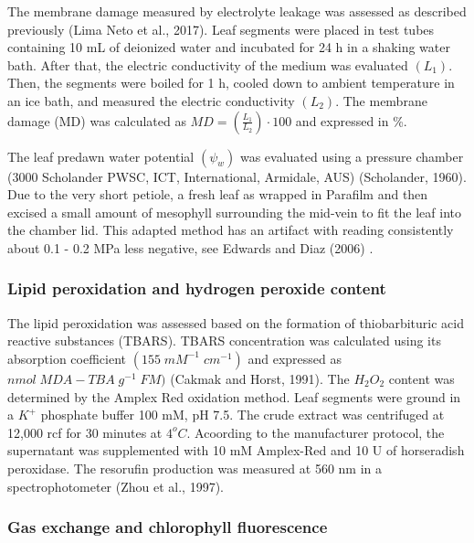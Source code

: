 \documentclass[
  12pt,
  letterpaper,
  DIV=11,
  numbers=noendperiod]{scrartcl}
\begin{document}
The membrane damage measured by electrolyte leakage was assessed as
described previously (Lima Neto et al., 2017). Leaf segments were placed
in test tubes containing 10 mL of deionized water and incubated for 24 h
in a shaking water bath. After that, the electric conductivity of the
medium was evaluated \((L_1)\). Then, the segments were boiled for 1 h,
cooled down to ambient temperature in an ice bath, and measured the
electric conductivity \((L_2)\). The membrane damage (MD) was calculated
as \(MD=\left(\frac{L_1} {L_2}\right) \cdot 100\) and expressed in \%.

The leaf predawn water potential \((\psi_w)\) was evaluated using a
pressure chamber (3000 Scholander PWSC, ICT, International, Armidale,
AUS) (Scholander, 1960). Due to the very short petiole, a fresh leaf as
wrapped in Parafilm and then excised a small amount of mesophyll
surrounding the mid-vein to fit the leaf into the chamber lid. This
adapted method has an artifact with reading consistently about 0.1 - 0.2
MPa less negative, see Edwards and Diaz (2006) .

\hypertarget{lipid-peroxidation-and-hydrogen-peroxide-content}{%
\subsubsection{Lipid peroxidation and hydrogen peroxide
content}\label{lipid-peroxidation-and-hydrogen-peroxide-content}}

The lipid peroxidation was assessed based on the formation of
thiobarbituric acid reactive substances (TBARS). TBARS concentration was
calculated using its absorption coefficient
\((155\; mM^{-1} \; cm^{-1})\) and expressed as
\(nmol\; MDA-TBA\; g^{-1}\; FM)\) (Cakmak and Horst, 1991). The
\(H_2O_2\) content was determined by the Amplex Red oxidation method.
Leaf segments were ground in a \(K^+\) phosphate buffer 100 mM, pH 7.5.
The crude extract was centrifuged at 12,000 rcf for 30 minutes at
\(4^o C\). Acoording to the manufacturer protocol, the supernatant was
supplemented with 10 mM Amplex-Red and 10 U of horseradish peroxidase.
The resorufin production was measured at 560 nm in a spectrophotometer
(Zhou et al., 1997).

\hypertarget{gas-exchange-and-chlorophyll-fluorescence}{%
\subsubsection{Gas exchange and chlorophyll
fluorescence}\label{gas-exchange-and-chlorophyll-fluorescence}}
\end{document}
